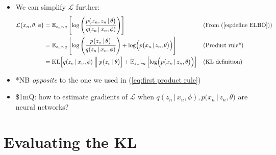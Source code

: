\documentclass{article}
\begin{document}
\begin{itemize}
    \item We can simplify $\mathcal{L}$ further:
    \begin{align}
        \mathcal{L}\bigl( x_n, \theta, \phi \bigr) &= \mathbb{E}_{z_n\sim q} \left[ \log\left( \frac{p\bigl(x_n, z_n \,\vert\, \theta\bigr)}{q(z_n \,\vert\, x_n, \phi)} \right) \right] && \text{(From (\ref{eq:define ELBO}))}\\
        &= \mathbb{E}_{z_n\sim q} \left[ \log\left( \frac{p\bigl(z_n \,\vert\, \theta\bigr)}{q(z_n \,\vert\, x_n, \phi)} \right) + \log \Bigl( p\bigl(x_n \,\vert\, z_n, \theta\bigr) \Bigr) \right] && \text{(Product rule*)} \\
        &= \text{KL}\Bigl[ q(z_n \,\vert\, x_n, \phi) \Bigm\Vert p\bigl(z_n \,\vert\, \theta\bigr) \Bigr] + \mathbb{E}_{z_n\sim q} \left[ \log \Bigl( p\bigl(x_n \,\vert\, z_n, \theta\bigr) \Bigr) \right] && \text{(KL definition)}
    \end{align}
    \item *NB \emph{opposite} to the one we used in (\ref{eq:first product rule})
    \item \$1mQ: how to estimate gradients of $\mathcal{L}$ when $q(z_n \,\vert\, x_n, \phi), p\bigl(x_n \,\vert\, z_n, \theta\bigr)$ are neural networks?
\end{itemize}

\newpage
\section{Evaluating the KL}
\end{document}

